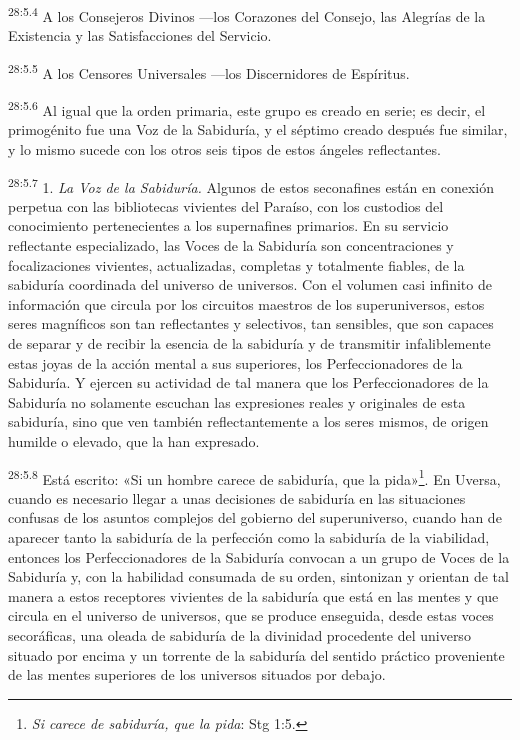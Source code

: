 \par
\textsuperscript{28:5.4} A los Consejeros Divinos ---los Corazones del Consejo, las Alegrías de la Existencia y las Satisfacciones del Servicio.

\par
\textsuperscript{28:5.5} A los Censores Universales ---los Discernidores de Espíritus.

\par
\textsuperscript{28:5.6} Al igual que la orden primaria, este grupo es creado en serie; es decir, el primogénito fue una Voz de la Sabiduría, y el séptimo creado después fue similar, y lo mismo sucede con los otros seis tipos de estos ángeles reflectantes.

\par
\textsuperscript{28:5.7} 1. \textit{La Voz de la Sabiduría.} Algunos de estos seconafines están en conexión perpetua con las bibliotecas vivientes del Paraíso, con los custodios del conocimiento pertenecientes a los supernafines primarios. En su servicio reflectante especializado, las Voces de la Sabiduría son concentraciones y focalizaciones vivientes, actualizadas, completas y totalmente fiables, de la sabiduría coordinada del universo de universos. Con el volumen casi infinito de información que circula por los circuitos maestros de los superuniversos, estos seres magníficos son tan reflectantes y selectivos, tan sensibles, que son capaces de separar y de recibir la esencia de la sabiduría y de transmitir infaliblemente estas joyas de la acción mental a sus superiores, los Perfeccionadores de la Sabiduría. Y ejercen su actividad de tal manera que los Perfeccionadores de la Sabiduría no solamente escuchan las expresiones reales y originales de esta sabiduría, sino que ven también reflectantemente a los seres mismos, de origen humilde o elevado, que la han expresado.

\par
\textsuperscript{28:5.8} Está escrito: «Si un hombre carece de sabiduría, que la pida»\footnote{\textit{Si carece de sabiduría, que la pida}: Stg 1:5.}. En Uversa, cuando es necesario llegar a unas decisiones de sabiduría en las situaciones confusas de los asuntos complejos del gobierno del superuniverso, cuando han de aparecer tanto la sabiduría de la perfección como la sabiduría de la viabilidad, entonces los Perfeccionadores de la Sabiduría convocan a un grupo de Voces de la Sabiduría y, con la habilidad consumada de su orden, sintonizan y orientan de tal manera a estos receptores vivientes de la sabiduría que está en las mentes y que circula en el universo de universos, que se produce enseguida, desde estas voces secoráficas, una oleada de sabiduría de la divinidad procedente del universo situado por encima y un torrente de la sabiduría del sentido práctico proveniente de las mentes superiores de los universos situados por debajo.

